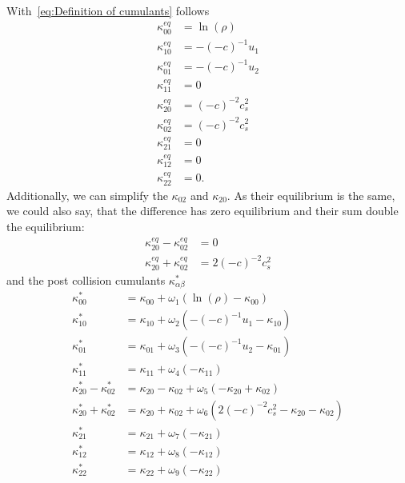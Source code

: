 \documentclass{article}
\begin{document}
With~\eqref{eq:Definition of cumulants} follows
\begin{equation}
  \label{eq:equilibrium cumulants}
  \begin{aligned}
    \kappa_{00}^{eq} & = \ln(\rho) \\
    \kappa_{10}^{eq} & = - {(-c)}^{-1} u_1 \\
    \kappa_{01}^{eq} & = - {(-c)}^{-1} u_2 \\
    \kappa_{11}^{eq} & = 0 \\
    \kappa_{20}^{eq} & = {(-c)}^{-2} c_s^2  \\
    \kappa_{02}^{eq} & = {(-c)}^{-2} c_s^2  \\
    \kappa_{21}^{eq} & = 0 \\
    \kappa_{12}^{eq} & = 0 \\
    \kappa_{22}^{eq} & = 0.
  \end{aligned}
\end{equation}
Additionally, we can simplify the $\kappa_{02}$ and $\kappa_{20}$. As their equilibrium is the same, we could also say, that the difference has zero equilibrium and their sum double the equilibrium:
\begin{equation}
  \begin{aligned}
    \kappa_{20}^{eq} - \kappa_{02}^{eq} & = 0  \\
    \kappa_{20}^{eq} + \kappa_{02}^{eq} & = 2 {(-c)}^{-2} c_s^2
  \end{aligned}
\end{equation}
%
and the post collision cumulants $\kappa_{\alpha\beta}^*$
\begin{equation}
  \label{eq: post equilibrium cumulants}
  \begin{aligned}
    \kappa_{00}^{*} & = \kappa_{00} + \omega_1 \left( \ln(\rho) - \kappa_{00} \right) \\
    \kappa_{10}^{*} & = \kappa_{10} + \omega_2 \left( - {(-c)}^{-1} u_1 - \kappa_{10} \right) \\
    \kappa_{01}^{*} & = \kappa_{01} + \omega_3 \left( - {(-c)}^{-1} u_2 - \kappa_{01} \right) \\
    \kappa_{11}^{*} & = \kappa_{11} + \omega_4 \left( - \kappa_{11} \right) \\
    \kappa_{20}^{*} - \kappa_{02}^{*}
      & = \kappa_{20} - \kappa_{02} + \omega_5 \left( - \kappa_{20} + \kappa_{02} \right) \\
    \kappa_{20}^{*} + \kappa_{02}^{*}
      & = \kappa_{20} + \kappa_{02} + \omega_6 \left( 2 {(-c)}^{-2} c_s^2 - \kappa_{20} - \kappa_{02} \right) \\
    \kappa_{21}^{*} & = \kappa_{21} + \omega_7 \left( - \kappa_{21} \right) \\
    \kappa_{12}^{*} & = \kappa_{12} + \omega_8 \left( - \kappa_{12} \right) \\
    \kappa_{22}^{*} & = \kappa_{22} + \omega_9 \left( - \kappa_{22} \right)
  \end{aligned}
\end{equation}
\end{document}
